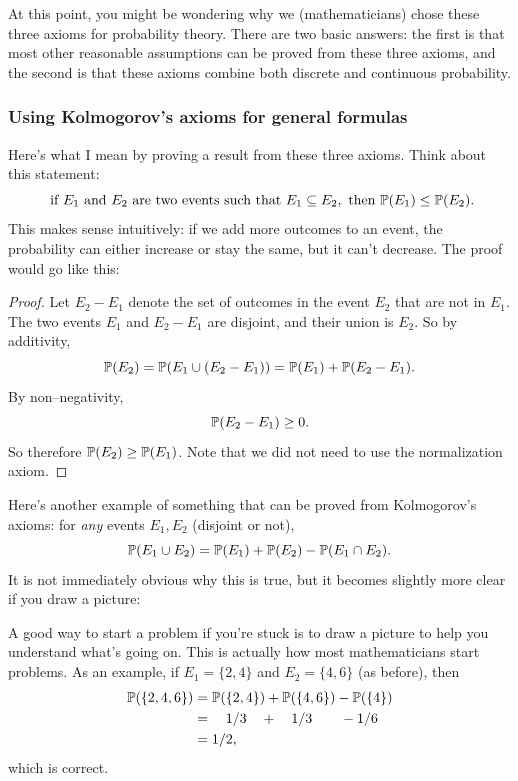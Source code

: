 \documentclass{ximera}
\begin{document}
At this point, you might be wondering why we (mathematicians) chose these three axioms for probability theory. There are two basic answers: the first is that most other reasonable assumptions can be proved from these three axioms, and the second is that these axioms combine both discrete and continuous probability.

\subsubsection{Using Kolmogorov's axioms for general formulas}
Here's what I mean by proving a result from these three axioms. Think about this statement:
\begin{equation}\label{Ex1}
\text{ if } E_1 \text{ and } E_2 \text{ are two events such that } E_1 \subseteq E_2, \text{ then } \mathbb{P}(E_1) \leq \mathbb{P}(E_2).
\end{equation}
This makes sense intuitively: if we add more outcomes to an event, the probability can either increase or stay the same, but it can't decrease. The proof would go like this:
\begin{proof}
Let $E_2-E_1$ denote the set of outcomes in the event $E_2$ that are not in $E_1$. The two events $E_1$ and $E_2-E_1$ are disjoint, and their union is $E_2$. So by additivity,
$$
\mathbb{P}(E_2) = \mathbb{P}(E_1 \cup (E_2-E_1)) = \mathbb{P}(E_1) + \mathbb{P}(E_2-E_1).
$$
By non--negativity, 
$$
\mathbb{P}(E_2-E_1) \geq 0.
$$
So therefore $\mathbb{P}(E_2)\geq \mathbb{P}(E_1)$. Note that we did not need to use the normalization axiom.
\end{proof}

Here's another example of something that can be proved from Kolmogorov's axioms: for \textit{any} events $E_1,E_2$ (disjoint or not),
$$
\mathbb{P}(E_1 \cup E_2) = \mathbb{P}(E_1) + \mathbb{P}(E_2 ) - \mathbb{P}(E_1 \cap E_2).
$$
It is not immediately obvious why this is true, but it becomes slightly more clear if you draw a picture:
\begin{center}
\end{center}
A good way to start a problem if you're stuck is to draw a picture to help you understand what's going on. This is actually how most mathematicians start problems. As an example, if $E_1 = \{2,4\}$ and $E_2 = \{4,6\}$ (as before), then
\begin{align*}
\mathbb{P}(\{2,4,6\}) &= \mathbb{P}(\{2,4\}) + \mathbb{P}(\{4,6\}) - \mathbb{P}(\{4\}) \\
&= \quad 1/3 \quad + \quad  1/3  \quad \quad - 1/6\\
&=  1/2,
\end{align*}
which is correct.
\end{document}
